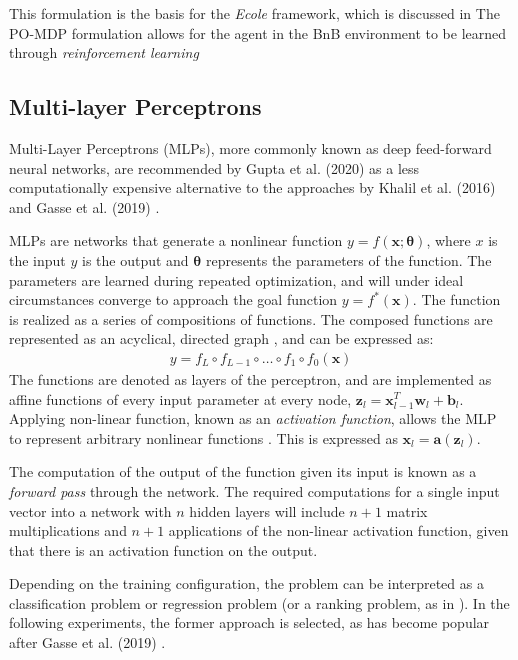 This formulation is the basis for the \textit{Ecole} framework, which is discussed in 
The \gls{PO-MDP} formulation allows for the agent in the \gls{BnB} environment to be learned through \textit{reinforcement learning}



\subsection{Multi-layer Perceptrons}

Multi-Layer Perceptrons (\gls{MLP}s), more commonly known as deep feed-forward neural networks, are recommended by Gupta et al. (2020) \cite{gupta2020hybrid} as a less computationally expensive alternative to the approaches by Khalil et al. (2016) \cite{khalil2016learning} and Gasse et al. (2019) \cite{gasse2019exact}. 

MLPs are networks that generate a nonlinear function $y = f(\mathbf{x}; \bm{\theta})$, where $x$ is the input $y$ is the output and $\bm{\theta}$ represents the parameters of the function. The parameters are learned during repeated optimization, and will under ideal circumstances converge to approach the goal function $y = f^*(\mathbf{x})$. The function is realized as a series of compositions of functions. The composed functions are represented as an acyclical, directed graph \cite{nielsen2018neural}, and can be expressed as:
\begin{align}
    y = f_L \circ f_{L-1} \circ \ldots \circ f_{1} \circ f_{0} (\mathbf{x})  
\end{align}
The functions are denoted as layers of the perceptron, and are implemented as affine functions of every input parameter at every node, $\mathbf{z}_l = \mathbf{x}_{l-1}^T \mathbf{w}_l + \mathbf{b}_l$. Applying non-linear function, known as an \textit{activation function}, allows the \gls{MLP} to represent arbitrary nonlinear functions \cite{goodfellow2016deep}. This is expressed as $\mathbf{x}_l = \mathbf{a}(\mathbf{z}_l)$.

The computation of the output of the function given its input is known as a \textit{forward pass} through the network. The required computations for a single input vector into a network with $ n $ hidden layers will include $ n + 1 $ matrix multiplications and $ n + 1 $ applications of the non-linear activation function, given that there is an activation function on the output. 

Depending on the training configuration, the problem can be interpreted as a classification problem or regression problem (or a ranking problem, as in \cite{khalil2016learning}). In the following experiments, the former approach is selected, as has become popular after Gasse et al. (2019) \cite{gasse2019exact}. 










